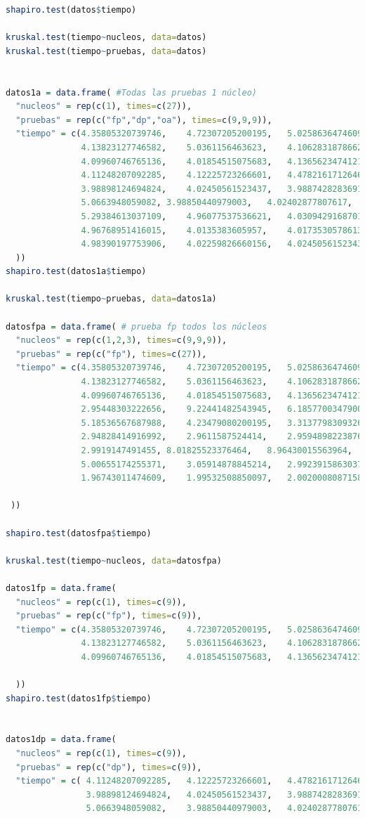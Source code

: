 \documentclass{article}
\begin{document}
\begin{lstlisting}[language=R]
shapiro.test(datos$tiempo)

kruskal.test(tiempo~nucleos, data=datos)
kruskal.test(tiempo~pruebas, data=datos)


datos1a = data.frame( #Todas las pruebas 1 núcleo)
  "nucleos" = rep(c(1), times=c(27)),
  "pruebas" = rep(c("fp","dp","oa"), times=c(9,9,9)),
  "tiempo" = c(4.35805320739746,	4.72307205200195,	5.02586364746093,
               4.13823127746582,	5.0361156463623,	4.10628318786621,
               4.09960746765136,	4.01854515075683,	4.1365623474121,
               4.11248207092285,	4.12225723266601,	4.47821617126464,
               3.98898124694824,	4.02450561523437,	3.98874282836914,
               5.0663948059082,	3.98850440979003,	4.02402877807617,	
               5.29384613037109,	4.96077537536621,	4.03094291687011,
               4.96768951416015,	4.0135383605957,	4.01735305786132,	
               4.98390197753906,	4.02259826660156,	4.02450561523437
  ))
shapiro.test(datos1a$tiempo)

kruskal.test(tiempo~pruebas, data=datos1a)

datosfpa = data.frame( # prueba fp todos los núcleos
  "nucleos" = rep(c(1,2,3), times=c(9,9,9)),
  "pruebas" = rep(c("fp"), times=c(27)),
  "tiempo" = c(4.35805320739746,	4.72307205200195,	5.02586364746093,
               4.13823127746582,	5.0361156463623,	4.10628318786621,	
               4.09960746765136,	4.01854515075683,	4.1365623474121, 
               2.95448303222656,	9.22441482543945,	6.18577003479003,	
               5.18536567687988,	4.23479080200195,	3.31377983093261,	
               2.94828414916992,	2.9611587524414,	2.95948982238769, 
               2.9919147491455,	8.01825523376464,	8.96430015563964,	
               5.00655174255371,	3.05914878845214,	2.99239158630371,	
               1.96743011474609,	1.99532508850097,	2.00200080871582

 ))

shapiro.test(datosfpa$tiempo)

kruskal.test(tiempo~nucleos, data=datosfpa)

datos1fp = data.frame(
  "nucleos" = rep(c(1), times=c(9)),
  "pruebas" = rep(c("fp"), times=c(9)),
  "tiempo" = c(4.35805320739746,	4.72307205200195,	5.02586364746093,
               4.13823127746582,	5.0361156463623,	4.10628318786621,
               4.09960746765136,	4.01854515075683,	4.1365623474121

  ))
shapiro.test(datos1fp$tiempo)


datos1dp = data.frame(
  "nucleos" = rep(c(1), times=c(9)),
  "pruebas" = rep(c("dp"), times=c(9)),
  "tiempo" = c(	4.11248207092285,	4.12225723266601,	4.47821617126464,
                3.98898124694824,	4.02450561523437,	3.98874282836914,
                5.0663948059082,	3.98850440979003,	4.02402877807617
               

\end{lstlisting}
\end{document}
